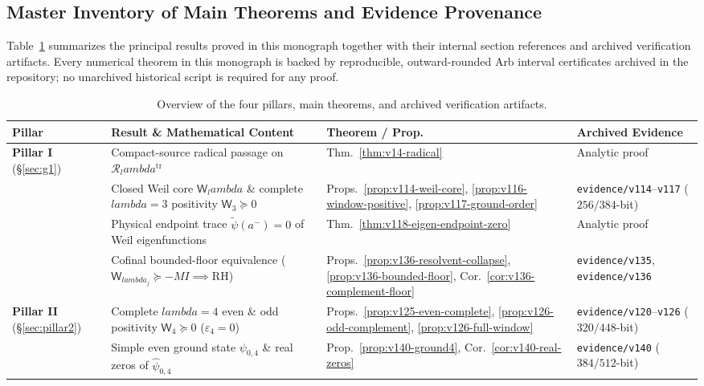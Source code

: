 \documentclass[11pt]{article}
\def\lambda{lambda}%
\theoremstyle{remark}
\begin{document}
\subsection{Master Inventory of Main Theorems and Evidence Provenance}
Table~\ref{tab:master-inventory} summarizes the principal results proved in this monograph together with their internal section references and archived verification artifacts. Every numerical theorem in this monograph is backed by reproducible, outward-rounded Arb interval certificates archived in the repository; no unarchived historical script is required for any proof.

\begin{table}[htbp]
\centering
\caption{Overview of the four pillars, main theorems, and archived verification artifacts.}
\label{tab:master-inventory}
\footnotesize
\begin{tabular}{>{\raggedright\arraybackslash}p{2.1cm}>{\raggedright\arraybackslash}p{5.5cm}>{\raggedright\arraybackslash}p{3.4cm}>{\raggedright\arraybackslash}p{3.5cm}}
\toprule
\textbf{Pillar} & \textbf{Result \& Mathematical Content} & \textbf{Theorem / Prop.} & \textbf{Archived Evidence} \\
\midrule
\textbf{Pillar I} (\S\ref{sec:g1}) & Compact-source radical passage on $\mathcal R_\lambda^{\mathrm{tr}}$ & Thm.~\ref{thm:v14-radical} & Analytic proof \\
 & Closed Weil core $\mathsf W_\lambda$ \& complete $\lambda=3$ positivity $\mathsf W_3\succeq 0$ & Props.~\ref{prop:v114-weil-core}, \ref{prop:v116-window-positive}, \ref{prop:v117-ground-order} & \texttt{evidence/v114}--\texttt{v117} ($256/384$-bit) \\
 & Physical endpoint trace $\widetilde\psi(a^-)=0$ of Weil eigenfunctions & Thm.~\ref{thm:v118-eigen-endpoint-zero} & Analytic proof \\
 & Cofinal bounded-floor equivalence ($\mathsf W_{\lambda_j}\succeq -MI \implies \mathrm{RH}$) & Props.~\ref{prop:v136-resolvent-collapse}, \ref{prop:v136-bounded-floor}, Cor.~\ref{cor:v136-complement-floor} & \texttt{evidence/v135}, \texttt{evidence/v136} \\
\midrule
\textbf{Pillar II} (\S\ref{sec:pillar2}) & Complete $\lambda=4$ even \& odd positivity $\mathsf W_4\succeq 0$ ($\varepsilon_4=0$) & Props.~\ref{prop:v125-even-complete}, \ref{prop:v126-odd-complement}, \ref{prop:v126-full-window} & \texttt{evidence/v120}--\texttt{v126} ($320/448$-bit) \\
 & Simple even ground state $\psi_{0,4}$ \& real zeros of $\widehat{\psi}_{0,4}$ & Prop.~\ref{prop:v140-ground4}, Cor.~\ref{cor:v140-real-zeros} & \texttt{evidence/v140} ($384/512$-bit) \\

\end{tabular}
\end{table}
\end{document}
